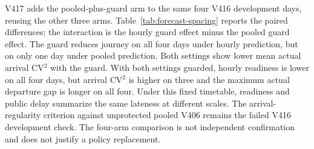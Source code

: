 V417 adds the pooled-plus-guard arm to the same four V416 development days,
reusing the other three arms. Table~\ref{tab:forecast-spacing} reports the
paired differences; the interaction is the hourly guard effect minus the
pooled guard effect. The guard reduces journey on all four days under
hourly prediction, but on only one day under pooled prediction. Both settings
show lower mean actual arrival CV$^2$ with the guard. With both settings
guarded, hourly readiness is lower on all four days, but arrival CV$^2$ is
higher on three and the maximum actual departure gap is longer on all
four. Under this fixed timetable, readiness and public delay summarize the
same lateness at different scales. The arrival-regularity criterion
against unprotected pooled V406 remains the failed V416 development check.
The four-arm comparison is not independent confirmation and does not
justify a policy replacement.

